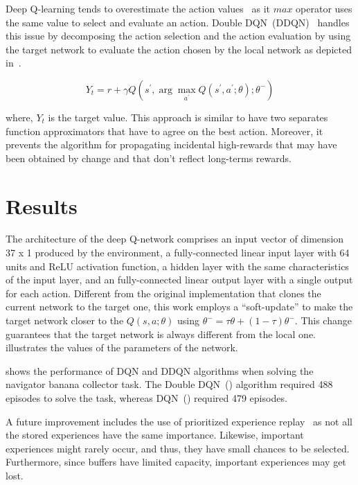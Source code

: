 \documentclass[12pt,english]{article}
\begin{document}
Deep Q-learning tends to overestimate the action values~\cite{van:16} as it \(max\) operator uses the same value to select and evaluate an action. Double DQN~(DDQN)~\cite{van:16} handles this issue by decomposing the action selection and the action evaluation by using the target network to evaluate the action chosen by the local network as depicted in~.

\begin{equation}\label{eq:ddqn}
 Y_t = r + \gamma{}Q(s^\prime{}, \arg\max_{a^{\prime}}Q(s^\prime{}, a^\prime{}; \theta);\theta^{-})
\end{equation} 

\noindent where, \(Y_t\) is the target value. This approach is similar to have two separates function approximators that have to agree on the best action. Moreover, it prevents the algorithm for propagating incidental high-rewards that may have been obtained by change and that don't reflect long-terms rewards. 

\section{Results}

The architecture of the deep Q-network comprises an input vector of dimension 37 x 1 produced by the environment, a fully-connected linear input layer with 64 units and ReLU activation function, a hidden layer with the same characteristics of the input layer, and an fully-connected linear output layer with a single output for each action. Different from the original implementation that clones the current network to the target one, this work employs a ``soft-update'' to make the target network closer to the \(Q(s,a;\theta)\) using \(\theta^{-} = \tau\theta + (1-\tau)\theta^{-}\). This change guarantees that the target network is always different from the local one.  illustrates the values of the parameters of the network. 

 shows the performance of DQN and DDQN algorithms when solving the navigator banana collector task. The Double DQN~() algorithm required 488 episodes to solve the task, whereas DQN~() required 479 episodes.

A future improvement includes the use of prioritized experience replay~\cite{schaul:15} as not all the stored experiences have the same importance. Likewise, important experiences might rarely occur, and thus, they have small chances to be selected. Furthermore, since buffers have limited capacity, important experiences may get lost. 
\end{document}
